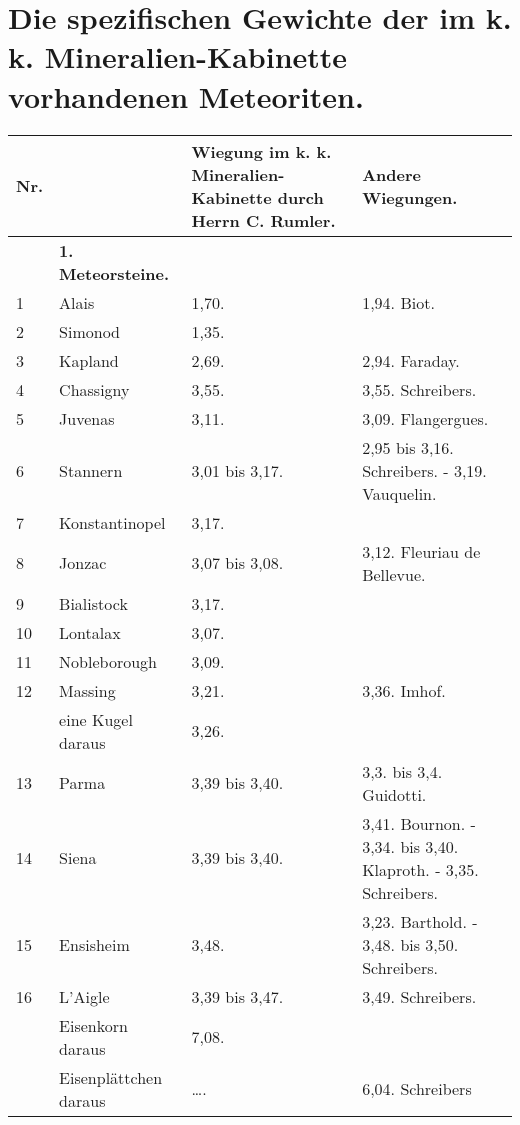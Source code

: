 \documentclass[a4paper, 11pt, oneside, polutonikogreek, german]{article}
\begin{document}
\section{Die spezifischen Gewichte der im k. k. Mineralien-Kabinette vorhandenen Meteoriten.}
\begin{center}
    \begin{longtable}{|p{7mm}|p{32mm}|p{30mm}|p{30mm}|}
    \hline
        Nr. & ~  & Wiegung im k. k. Mineralien-Kabinette durch Herrn C. Rumler. & Andere Wiegungen. \\ \hline
         ~ & \textbf{1. Meteorsteine.} & ~  & ~  \\ \hline
        1 & Alais & 1,70. & 1,94. Biot. \\ \hline
        2 & Simonod & 1,35. &   \\ \hline
        3 & Kapland & 2,69. & 2,94. Faraday. \\ \hline
        4 & Chassigny & 3,55. & 3,55. Schreibers. \\ \hline
        5 & Juvenas & 3,11. & 3,09. Flangergues. \\ \hline
        6 & Stannern & 3,01 bis 3,17. & 2,95 bis 3,16. Schreibers. - 3,19. Vauquelin. \\ \hline
        7 & Konstantinopel & 3,17. &   \\ \hline
        8 & Jonzac & 3,07 bis 3,08. & 3,12. Fleuriau de Bellevue. \\ \hline
        9 & Bialistock & 3,17. &   \\ \hline
        10 & Lontalax & 3,07. &   \\ \hline
        11 & Nobleborough & 3,09. &   \\ \hline
        12 & Massing & 3,21. & 3,36. Imhof. \\ \hline
          & eine Kugel daraus & 3,26. &   \\ \hline
        13 & Parma & 3,39 bis 3,40. & 3,3. bis 3,4. Guidotti. \\ \hline
        14 & Siena & 3,39 bis 3,40. & 3,41. Bournon. - 3,34. bis 3,40. Klaproth. - 3,35. Schreibers. \\ \hline
        15 & Ensisheim & 3,48. & 3,23. Barthold. - 3,48. bis 3,50. Schreibers. \\ \hline
        16 & L’Aigle & 3,39 bis 3,47. & 3,49. Schreibers. \\ \hline
          & Eisenkorn daraus & 7,08. &   \\ \hline
          & Eisenplättchen daraus & …. & 6,04. Schreibers \\ \hline

\end{longtable}
\end{center}
\end{document}
